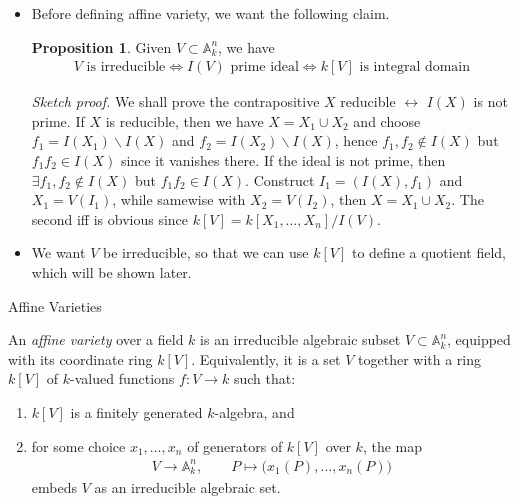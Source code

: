 \documentclass[8pt]{beamer}
\newcommand{\A}{\mathbb{A}}
\theoremstyle{definition}
\newtheorem{proposition}[theorem]{Proposition}
\begin{document}
    \begin{frame}
        \begin{itemize}
            \item Before defining affine variety, we want the following claim.
            
            \begin{proposition}
                Given $V \subset \A^n_k$, we have 
                \begin{align*}
                    V \text{ is irreducible} \iff I(V) \text{ prime ideal} \iff k[V] \text{ is integral domain}
                \end{align*}
            \end{proposition}
            \textit{Sketch proof.} We shall prove the contrapositive $X$ reducible $\leftrightarrow$ $I(X)$ is not prime. If $X$ is  reducible, then we have $X = X_1 \cup X_2$ and choose $f_1 = I(X_1)\backslash I(X)$ and $f_2 = I(X_2) \backslash I(X)$, hence $f_1, f_2 \notin I(X)$ but $f_1f_2 \in I(X)$ since it vanishes there. If the ideal is not prime, then $\exists f_1, f_2 \notin I(X)$ but $f_1f_2 \in I(X)$. Construct $I_1 = (I(X), f_1)$ and $X_1 = V(I_1)$, while samewise with $X_2 = V(I_2)$, then $X = X_1 \cup X_2$. The second iff is obvious since $k[V] = k[X_1, \ldots, X_n]/I(V)$.      
            
            \item We want $V$ be irreducible, so that we can use $k[V]$ to define a quotient field, which will be shown later.
        \end{itemize}
        
    \end{frame}

    \begin{frame}{Affine Varieties}

        \begin{definition}
            An \emph{affine variety} over a field $k$ is an irreducible algebraic subset $V \subset \mathbb{A}^n_k$, equipped with its coordinate ring $k[V]$. Equivalently, it is a set $V$ together with a ring $k[V]$ of $k$-valued functions $f\colon V \to k$ such that:
            \begin{enumerate}
                \item $k[V]$ is a finitely generated $k$-algebra, and
                \item for some choice $x_1, \dots, x_n$ of generators of $k[V]$ over $k$, the map
                \begin{align*}
                    V \to \mathbb{A}^n_k, \qquad P \mapsto \bigl(x_1(P), \dots, x_n(P)\bigr)
                \end{align*}
                embeds $V$ as an irreducible algebraic set.
            \end{enumerate}
        \end{definition}
    \end{frame}
\end{document}
